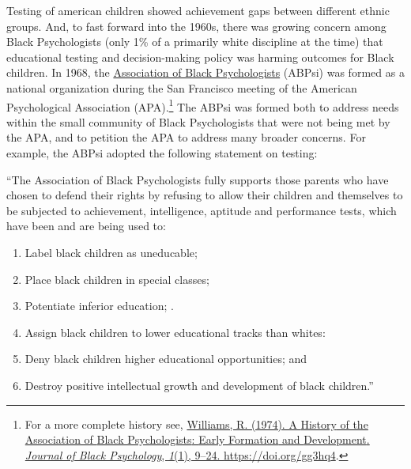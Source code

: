 \documentclass[
  oneside,
  12pt]{crumpbook}
\providecommand{\tightlist}{%
  \setlength{\itemsep}{0pt}\setlength{\parskip}{0pt}}
\begin{document}
Testing of american children showed achievement gaps between different ethnic groups. And, to fast forward into the 1960s, there was growing concern among Black Psychologists (only 1\% of a primarily white discipline at the time) that educational testing and decision-making policy was harming outcomes for Black children. In 1968, the \href{https://abpsi.org}{Association of Black Psychologists} (ABPsi) was formed as a national organization during the San Francisco meeting of the American Psychological Association (APA).\footnote{For a more complete history see, \protect\hyperlink{ref-williamsHistoryAssociationBlack1974}{Williams, R. (1974). A {History} of the {Association} of {Black Psychologists}: {Early Formation} and {Development}. \emph{Journal of Black Psychology}, \emph{1}(1), 9--24. \url{https://doi.org/gg3hq4}}.} The ABPsi was formed both to address needs within the small community of Black Psychologists that were not being met by the APA, and to petition the APA to address many broader concerns. For example, the ABPsi adopted the following statement on testing:

``The Association of Black Psychologists fully supports those parents who have chosen to defend their rights by refusing to allow their children and themselves to be subjected to achievement, intelligence, aptitude and performance tests, which have been and are being used to:

\begin{enumerate}
\def\labelenumi{\arabic{enumi}.}
\tightlist
\item
  Label black children as uneducable;
\item
  Place black children in special classes;
\item
  Potentiate inferior education; .
\item
  Assign black children to lower educational tracks than whites:
\item
  Deny black children higher educational opportunities; and
\item
  Destroy positive intellectual growth and development of black children.''
\end{enumerate}
\end{document}
